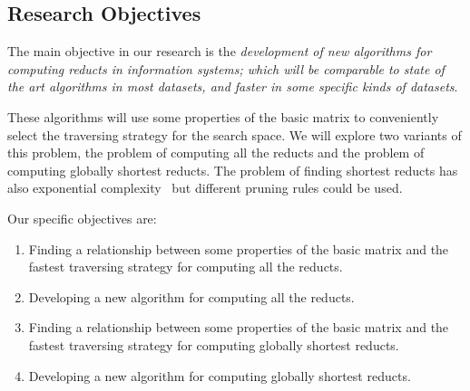 \documentclass[authoryear,11pt]{elsarticle}
\begin{document}
\subsection{Research Objectives}\label{Goals} 
  The main objective in our research is the \emph{development of new algorithms for computing reducts in
  information systems; which will be comparable to state of the art algorithms 
  in most datasets, and faster in some specific kinds of datasets}. 
  
  These algorithms will use some properties 
  of the basic matrix to conveniently select the traversing strategy for the search space. We will explore two
  variants of this problem, the problem of computing all the reducts and the problem of computing globally 
  shortest reducts. The problem of finding shortest reducts has also 
  exponential complexity~\citep{Lin04} but different pruning rules could be used.
  
  Our specific objectives are:
  \begin{enumerate}
  \item Finding a relationship between some properties of the basic matrix and the fastest 
  		traversing strategy for computing all the reducts.
  		  	
  		
  
  \item Developing a new algorithm for computing all the reducts.
  		
  \item Finding a relationship between some properties of the basic matrix and the fastest 
  		traversing strategy for computing globally shortest reducts.
  		  	
  		
  
  \item Developing a new algorithm for computing globally shortest reducts.
%  
  \end{enumerate}
\end{document}
